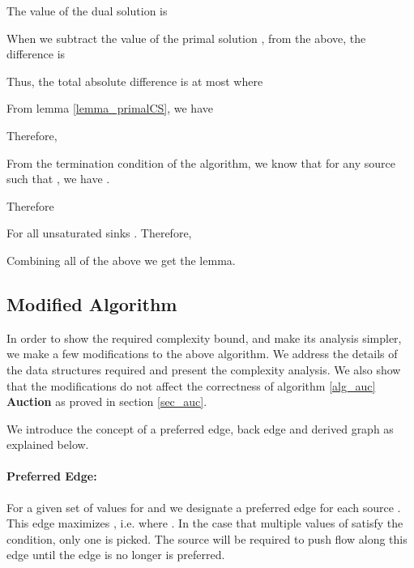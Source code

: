 \documentclass[11pt]{article}
\newenvironment{proof}{\par\noindent{\bf Proof:}}{\mbox{}\hfill\\}
\begin{document}
\begin{proof}
The value of the dual solution is 


When we subtract the value of the primal solution , from the
above, the  difference is



Thus, the total absolute difference is at most  where







From lemma \ref{lemma_primalCS}, we have 



Therefore, 



From the termination condition of the algorithm, we know that for any source
 such that , we have .

Therefore 





For all unsaturated sinks . Therefore, 


Combining all of the above we get the lemma.
\end{proof}












\label{section_auction}


\subsection{Modified Algorithm}
\label{section_modified}
\label{sec_modified}

In order to show the required complexity bound, and make its analysis simpler, we make
a few modifications to the above algorithm. We address the details of
the data structures required and present the complexity analysis.
We also show that the modifications do not affect the correctness of 
algorithm \ref{alg_auc} {\bf Auction} as proved in section \ref{sec_auc}.

We introduce the concept of a preferred edge, back edge and derived graph 
as explained below. 

\paragraph*{Preferred Edge: }
For a given set of values for  and  we designate
a preferred edge  for each source . This edge maximizes
, i.e.  where 
. 
In the case that multiple values of  satisfy the condition, only one is picked.
The source  will be required to push
flow along this edge until the edge is no longer is preferred. 
\end{document}
